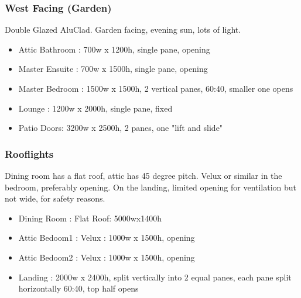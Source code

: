 \subsubsection{West Facing (Garden)}
Double Glazed AluClad. Garden facing, evening sun, lots of light.
\begin{itemize}
\item Attic Bathroom : 700w x 1200h, single pane, opening
\item Master Ensuite : 700w x 1500h, single pane, opening
\item Master Bedroom : 1500w x 1500h, 2 vertical panes, 60:40, smaller one opens
\item Lounge : 1200w x 2000h, single pane, fixed
\item Patio Doors: 3200w x 2500h, 2 panes, one "lift and slide"
\end{itemize}

\subsubsection{Rooflights}
Dining room has a flat roof, attic has 45 degree pitch. Velux or similar in the bedroom, preferably opening.
On the landing, limited opening for ventilation but not wide, for safety reasons.
\begin{itemize}
\item Dining Room : Flat Roof: 5000wx1400h
\item Attic Bedoom1 : Velux : 1000w x 1500h, opening
\item Attic Bedoom2 : Velux : 1000w x 1500h, opening
\item Landing : 2000w x 2400h, split vertically into 2 equal panes, each pane split horizontally 60:40, top half opens
\end{itemize}    
